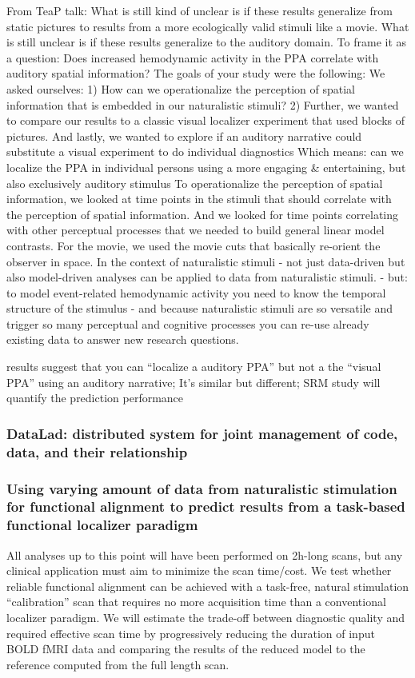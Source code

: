 From TeaP talk:
%
What is still kind of unclear is if these results generalize from static
pictures to results from a more ecologically valid stimuli like a movie.
%
What is still unclear is if these results generalize to the auditory domain.  To
frame it as a question: Does increased hemodynamic activity in the PPA correlate
with auditory spatial information?
%
The goals of your study were the following: We asked ourselves:
%
1) How can we operationalize the perception of spatial information that is
embedded in our naturalistic stimuli?
%
2) Further, we wanted to compare our results to a classic visual localizer
experiment that used blocks of pictures.
%
And lastly, we wanted to explore if an auditory narrative could substitute a
visual experiment to do individual diagnostics
%
Which means: can we localize the PPA in individual persons using a more engaging
\& entertaining, but also exclusively auditory stimulus
%
To operationalize the perception of spatial information, we looked at time
points in the stimuli that should correlate with the perception of spatial
information.
%
And we looked for time points correlating with other perceptual processes that
we needed to build general linear model contrasts.
%
For the movie, we used the movie cuts that basically re-orient the observer in
space.
%
In the context of naturalistic stimuli - not just data-driven but also
model-driven analyses can be applied to data from naturalistic stimuli.
%
- but: to model event-related hemodynamic activity you need to know the temporal
structure of the stimulus
%
- and because naturalistic stimuli are so versatile and trigger so many
perceptual and cognitive processes you can re-use already existing data to
answer new research questions.


results suggest that you can ``localize a auditory PPA'' but not a the ``visual
PPA'' using an auditory narrative; It's similar but different; SRM study will
quantify the prediction performance

\subsubsection{DataLad: distributed system for joint management of code, data,
and their relationship}



\subsubsection{Using varying amount of data from naturalistic stimulation for
functional alignment to predict results from a task-based functional localizer
paradigm}
%
All analyses up to this point will have been performed on 2h-long scans, but any
clinical application must aim to minimize the scan time/cost.
%
We test whether reliable functional alignment can be achieved with a task-free,
natural stimulation ``calibration” scan that requires no more acquisition time
than a conventional localizer paradigm.
%
We will estimate the trade-off between diagnostic quality and required effective
scan time by progressively reducing the duration of input BOLD fMRI data and
comparing the results of the reduced model to the reference computed from the
full length scan.


